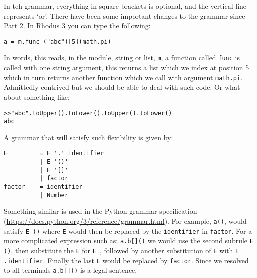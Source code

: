 In teh grammar, everything in square brackets is optional, and the vertical line represents `or'. There have been some important changes to the grammar since Part 2. In Rhodus 3 you can type the following:

\begin{lstlisting}
a = m.func ("abc")[5](math.pi)
\end{lstlisting}

In words, this reads, in the module, string or list, {\tt m}, a function called {\tt func} is called with one string argument, this returns a list which we index at position 5 which in turn returns another function which we call with argument {\tt math.pi}. Admittedly contrived but we should be able to deal with such code. Or what about something like:

\begin{lstlisting}
>>"abc".toUpper().toLower().toUpper().toLower()
abc
\end{lstlisting}

A grammar that will satisfy such flexibility is given by:


{\footnotesize
\begin{verbatim}
E         = E '.' identifier
          | E '()'
          | E '[]'
          | factor
factor    = identifier
          | Number
\end{verbatim} }

Something similar is used in the Python grammar specification (\url{https://docs.python.org/3/reference/grammar.html}). For example, {\tt a()}, would satisfy {\tt E \textquotesingle()\textquotesingle} where {\tt E} would then be replaced by the {\tt identifier} in {\tt factor}. For a more complicated expression such as: {\tt a.b[]()} we would use the second subrule {\tt E \textquotesingle()\textquotesingle}, then substitute the {\tt E} for {\tt E \textquotesingle[]\textquotesingle}, followed by another substitution of {\tt E} with {\tt E \textquotesingle.\textquotesingle identifier}. Finally the last {\tt E} would be replaced by {\tt factor}. Since we resolved to all terminals {\tt a.b[]()} is a legal sentence.

